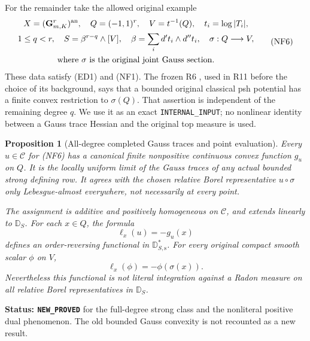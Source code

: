 \documentclass[11pt,a4paper]{article}
\numberwithin{equation}{section}
\newtheorem{proposition}[theorem]{Proposition}
\theoremstyle{definition}
\theoremstyle{remark}
\begin{document}
For the remainder take the allowed original example
\[
 \begin{gathered}
 X=(\mathbf G_{m,K}^{r})^{\rm an},\quad
 Q=(-1,1)^r,\quad V=t^{-1}(Q),\quad t_i=\log|T_i|,\\
 1\leq q<r,\quad S=\beta^{r-q}\wedge[V],\quad
 \beta=\sum_i d't_i\wedge d''t_i,\quad \sigma:Q\longrightarrow V,\\
 \text{where }\sigma\text{ is the original joint Gauss section}.
 \end{gathered}
 \tag{NF6}
\]
These data satisfy (ED1) and (NF1). The frozen R6
, used in R11
before the choice of its background, says that a bounded
original classical psh potential has a finite convex
restriction to $\sigma(Q)$. That assertion is independent
of the remaining degree $q$. We use it as an exact
\texttt{INTERNAL\_INPUT}; no nonlinear identity between
a Gauss trace Hessian and the original top measure is used.

\begin{proposition}[All-degree completed Gauss traces and point evaluation]
\label{prop:r12-completed-gauss-evaluation}
Every $u\in\mathscr C$ for (NF6) has a canonical finite
nonpositive continuous convex function $g_u$ on $Q$.
It is the locally uniform limit of the Gauss traces of any
actual bounded strong defining row. It agrees with the
chosen relative Borel representative $u\circ\sigma$ only
Lebesgue-almost everywhere, not necessarily at every point.

The assignment is additive and positively homogeneous on
$\mathscr C$, and extends linearly to $\mathbb D_S$.
For each $x\in Q$, the formula
\[
                         \ell_x(u)=-g_u(x)
 \tag{NF7}
\]
defines an order-reversing functional in
$\mathbb D_{S,\mathrm s}^*$. For every original compact
smooth scalar $\phi$ on $V$,
\[
                              \ell_x(\phi)=-\phi(\sigma(x)).
 \tag{NF8}
\]
Nevertheless this functional is not literal integration
against a Radon measure on all relative Borel representatives
in $\mathbb D_S$.
\end{proposition}

\noindent\textbf{Status: \texttt{NEW\_PROVED}} for the
full-degree strong class and the nonliteral positive dual
phenomenon. The old bounded Gauss convexity is not recounted
as a new result.
\end{document}
